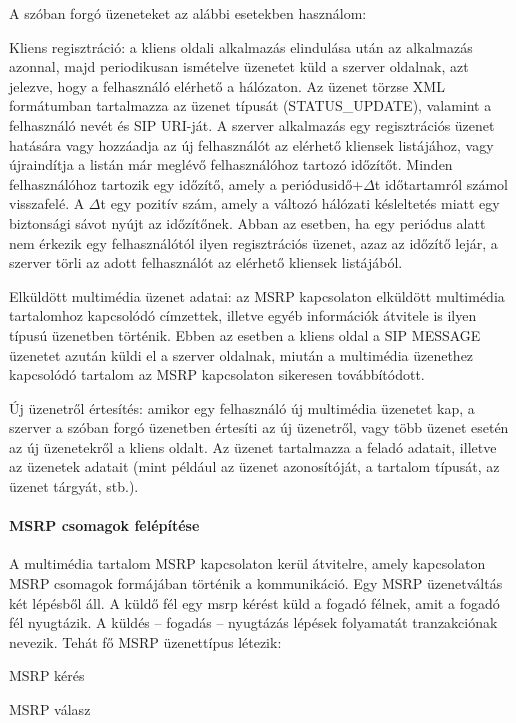 A szóban forgó üzeneteket az alábbi esetekben használom:
\begin{mydescription}
\item[Kliens regisztráció:] a kliens oldali alkalmazás elindulása után az al\-kal\-ma\-zás azonnal, majd periodikusan ismételve üzenetet küld a szerver oldalnak, azt jelezve, hogy a felhasználó elérhető a hálózaton. Az üzenet törzse XML formátumban tartalmazza az üzenet típusát (STATUS\_UPDATE), valamint a felhasználó nevét és SIP URI-ját. A szerver alkalmazás egy regisztrációs üzenet hatására vagy hozzáadja az új felhasználót az elérhető kliensek listájához, vagy újraindítja a listán már meglévő felhasználóhoz tartozó időzítőt. Minden felhasználóhoz tartozik egy időzítő, amely a periódusidő+$\Delta$t időtartamról számol visszafelé. A $\Delta$t egy pozitív szám, amely a változó hálózati késleltetés miatt egy biztonsági sávot nyújt az időzítőnek. Abban az esetben, ha egy periódus alatt nem érkezik egy felhasználótól ilyen regisztrációs üzenet, azaz az időzítő lejár, a szerver törli az adott felhasználót az elérhető kliensek listájából.
\item[Elküldött multimédia üzenet adatai:] az MSRP kapcsolaton elküldött multimédia tartalomhoz kapcsolódó címzettek, illetve egyéb információk átvitele is ilyen típusú üzenetben történik. Ebben az esetben a kliens oldal a SIP MESSAGE üzenetet azután küldi el a szerver oldalnak, miután a multimédia üzenethez kapcsolódó tartalom az MSRP kapcsolaton sikeresen továbbítódott.
\item[Új üzenetről értesítés:] amikor egy felhasználó új multimédia üzenetet kap, a szerver a szóban forgó üzenetben értesíti az új üzenetről, vagy több üzenet esetén az új üzenetekről a kliens oldalt. Az üzenet tartalmazza a feladó adatait, illetve az üzenetek adatait (mint például az üzenet azonosítóját, a tartalom típusát, az üzenet tárgyát, stb.).
\end{mydescription}

\paragraph{MSRP csomagok felépítése\\}
\label{sec:msrp_chunks}

A multimédia tartalom MSRP kapcsolaton kerül átvitelre, amely kapcsolaton MSRP csomagok formájában történik a kommunikáció. Egy MSRP üzenetváltás két lépésből áll. A küldő fél egy msrp kérést küld a fogadó félnek, amit a fogadó fél nyugtázik. A küldés -- fogadás -- nyugtázás lépések folyamatát tranzakciónak nevezik. Tehát fő MSRP üzenettípus létezik:
\begin{myenumerate}
\item \label{enum:msrp_req} MSRP kérés
\item \label{enum:msrp_resp} MSRP válasz
\end{myenumerate}
\bigskip

